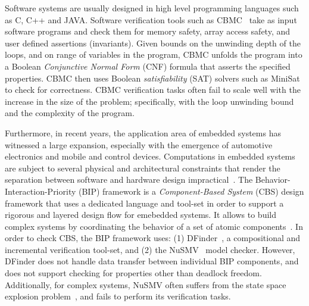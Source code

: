 Software systems are usually designed in high level programming languages 
such as C, C++ and JAVA. 
Software verification tools such as CBMC~\cite{clarke2004tool}
take as input software programs and check them for 
memory safety, array access safety, and user defined assertions (invariants). 
Given bounds on the unwinding depth of the loops, and on range of variables in the program, 
CBMC unfolds the program
into a Boolean {\em Conjunctive Normal Form} (CNF) formula that asserts the specified 
properties. CBMC then uses Boolean {\em satisfiability} (SAT) solvers such as MiniSat~\cite{sorensson2005minisat}
to check for correctness. CBMC verification tasks often fail to scale well 
with the increase in the size of the problem; specifically, with the loop unwinding bound and 
the complexity of the program. 

Furthermore, in recent years, 
the application area of embedded systems has witnessed a large expansion, especially with 
the emergence of automotive electronics and mobile and control devices.
Computations in embedded systems are subject to several physical and architectural 
constraints that render the separation between software and hardware design impractical~\cite{henzinger2006embedded}.
The Behavior-Interaction-Priority (BIP) framework 
is a {\em Component-Based System} (CBS) design framework that uses a dedicated 
language and tool-set in order to support a rigorous and layered design flow for emebedded systems.  
It allows
to build complex systems by coordinating the behavior of a set of atomic components~\cite{BasuBBCJNS11}.
In order to check CBS,  the BIP framework uses: (1) DFinder~\cite{dfinder}, a compositional  
and incremental verification tool-set, and (2) the NuSMV~\cite{nusmv} model checker.
However, DFinder does not handle data transfer between individual 
BIP components, and does not support checking for properties other than deadlock freedom. 
Additionally, for complex systems, NuSMV often suffers from the state space explosion 
problem~\cite{sipser2006introduction}, and fails to perform its verification tasks.

